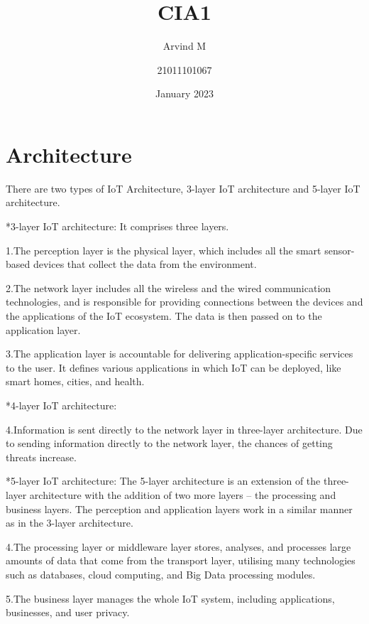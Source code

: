 \documentclass{article}
\title{CIA1}
\author{Arvind M}
\author{21011101067}
\date{January 2023}
\begin{document}
\maketitle

 \section{Architecture}

 \begin{Architecture}
There are two types of IoT Architecture, 3-layer IoT architecture and 5-layer IoT architecture.\hfill \break

*3-layer IoT architecture: It comprises three layers.\hfill \break

1.The perception layer is the physical layer, which includes all the smart sensor-based devices that collect the data from the environment.\hfill \break

2.The network layer includes all the wireless and the wired communication technologies, and is responsible for providing connections between the devices and the applications of the IoT ecosystem. The data is then passed on to the application layer.\hfill \break

3.The application layer is accountable for delivering application-specific services to the user. It defines various applications in which IoT can be deployed, like smart homes, cities, and health.\hfill \break

*4-layer IoT architecture:

4.Information is sent directly to the network layer in three-layer architecture. Due to sending information directly to the network layer, the chances of getting threats increase.\hfill \break

*5-layer IoT architecture: The 5-layer architecture is an extension of the three-layer architecture with the addition of two more layers – the processing and business layers. The perception and application layers work in a similar manner as in the 3-layer architecture.\hfill \break

4.The processing layer or middleware layer stores, analyses, and processes large amounts of data that come from the transport layer, utilising many technologies such as databases, cloud computing, and Big Data processing modules.\hfill \break

5.The business layer manages the whole IoT system, including applications, businesses, and user privacy.\hfill \break

\end{Architecture}
\end{document}

